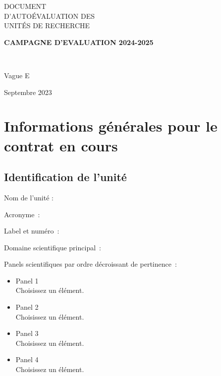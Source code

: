 \documentclass[]{article}
\begin{document}
\begin{titlepage}
\begin{tcolorbox}[standard jigsaw, opacityback=0, opacityframe=0,boxsep=.7cm,left skip=4cm, right skip=-4cm, before skip=5cm]
{\color{hcerespurple}\LARGE DOCUMENT\\
D'AUTOÉVALUATION DES\\
UNITÉS DE RECHERCHE}


\vskip 2cm
{\raggedright\color{hceresred}\bf\large CAMPAGNE D'EVALUATION 2024-2025
}\\
{\raggedright\color{hceresred}\large Vague E
}
\par\vskip 2cm
{\raggedright\color{hcerespurple}\large Septembre 2023}

\par
\end{tcolorbox}

\date{Septembre 2023}
\end{titlepage}



\section{Informations générales pour le contrat en cours}

\subsection{Identification de l'unité}

Nom de l'unité :

Acronyme~:

Label et numéro~:

Domaine scientifique principal~:

Panels scientifiques par ordre décroissant de pertinence~:

\begin{itemize}
\tightlist
\item
  Panel 1\\
  Choisissez un élément.
\item
  Panel 2\\
  Choisissez un élément.
\item
  Panel 3\\
  Choisissez un élément.
\item
  Panel 4\\
  Choisissez un élément.
\end{itemize}
\end{document}
